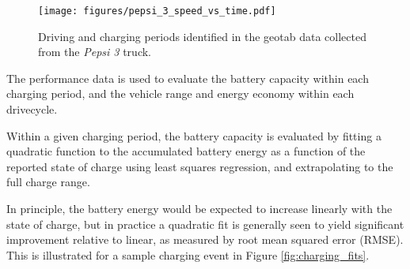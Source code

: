 \begin{figure}[H]
        \centering
        \texttt{[image: figures/pepsi\_3\_speed\_vs\_time.pdf]}
        \caption{Driving and charging periods identified in the geotab data collected from the \textit{Pepsi 3} truck.}
        \label{fig:pepsi_3_drivecycles}
\end{figure}


The performance data is used to evaluate the battery capacity within each charging period, and the vehicle range and energy economy within each drivecycle.

Within a given charging period, the battery capacity is evaluated by fitting a quadratic function to the accumulated battery energy as a function of the reported state of charge using least squares regression, and extrapolating to the full charge range.

In principle, the battery energy would be expected to increase linearly with the state of charge, but in practice a quadratic fit is generally seen to yield significant improvement relative to linear, as measured by root mean squared error (RMSE). This is illustrated for a sample charging event in Figure \ref{fig:charging_fits}.

